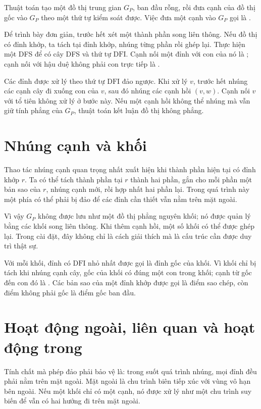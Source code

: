 \documentclass[11pt]{article}
\newcommand{\GP}{G_P}
\newcommand{\DFI}{\mathrm{DFI}}
\begin{document}
Thuật toán tạo một đồ thị trung gian \(\GP\), ban đầu rỗng, rồi đưa cạnh của
đồ thị gốc vào \(\GP\) theo một thứ tự kiểm soát được. Việc đưa một cạnh vào
\(\GP\) gọi là .

Để trình bày đơn giản, trước hết xét một thành phần song liên thông. Nếu đồ
thị có đỉnh khớp, ta tách tại đỉnh khớp, nhúng từng phần rồi ghép lại. Thực
hiện một DFS để có cây DFS và thứ tự \(\DFI\). Cạnh nối một đỉnh với con của
nó là ; cạnh nối với hậu duệ không phải con trực tiếp là
.

Các đỉnh được xử lý theo thứ tự \(\DFI\) đảo ngược. Khi xử lý \(v\), trước
hết nhúng các cạnh cây đi xuống con của \(v\), sau đó nhúng các cạnh hồi
\((v,w)\). Cạnh nối \(v\) với tổ tiên không xử lý ở bước này. Nếu một cạnh
hồi không thể nhúng mà vẫn giữ tính phẳng của \(\GP\), thuật toán kết luận
đồ thị không phẳng.

\section{Nhúng cạnh và khối}

Thao tác nhúng cạnh quan trọng nhất xuất hiện khi thành phần hiện tại có đỉnh
khớp \(r\). Ta có thể tách thành phần tại \(r\) thành hai phần, gắn cho mỗi
phần một bản sao của \(r\), nhúng cạnh mới, rồi hợp nhất hai phần lại. Trong
quá trình này một phía có thể phải bị đảo để các đỉnh cần thiết vẫn nằm trên
mặt ngoài.

Vì vậy \(\GP\) không được lưu như một đồ thị phẳng nguyên khối; nó được quản
lý bằng các khối song liên thông. Khi thêm cạnh hồi, một số khối có thể được
ghép lại. Trong cài đặt, đây không chỉ là cách giải thích mà là cấu trúc cần
được duy trì thật sự.

Với mỗi khối, đỉnh có \(\DFI\) nhỏ nhất được gọi là đỉnh gốc của khối. Vì
khối chỉ bị tách khi nhúng cạnh cây, gốc của khối có đúng một con trong khối;
cạnh từ gốc đến con đó là . Các bản sao của một đỉnh khớp
được gọi là điểm sao chép, còn điểm không phải gốc là điểm gốc ban đầu.

\section{Hoạt động ngoài, liên quan và hoạt động trong}

Tính chất mà phép đảo phải bảo vệ là: trong suốt quá trình nhúng, mọi đỉnh
 đều phải nằm trên mặt ngoài. Mặt ngoài là chu trình
biên tiếp xúc với vùng vô hạn bên ngoài. Nếu một khối chỉ có một cạnh, nó
được xử lý như một chu trình suy biến để vẫn có hai hướng đi trên mặt ngoài.
\end{document}
